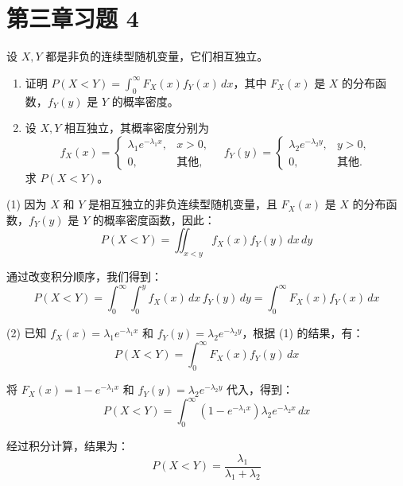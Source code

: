 \documentclass[twoside]{article}
\begin{document}
\maketitle
\vspace{-3.5em}

\tableofcontents

\section{第三章习题 4}

设 \( X, Y \) 都是非负的连续型随机变量，它们相互独立。
\begin{enumerate}
    \item 证明 \( P(X < Y) = \int_0^{\infty} F_X(x) f_Y(x) \, dx \)，其中 \( F_X(x) \) 是 \( X \) 的分布函数，\( f_Y(y) \) 是 \( Y \) 的概率密度。
    \item 设 \( X, Y \) 相互独立，其概率密度分别为
    \[
    f_X(x) = 
    \begin{cases} 
        \lambda_1 e^{-\lambda_1 x}, & x > 0, \\
        0, & \text{其他},
    \end{cases}
    \quad
    f_Y(y) = 
    \begin{cases} 
        \lambda_2 e^{-\lambda_2 y}, & y > 0, \\
        0, & \text{其他}.
    \end{cases}
    \]
    求 \( P(X < Y) \)。
\end{enumerate}

\begin{ans}{4}{4}
    (1) 因为 \( X \) 和 \( Y \) 是相互独立的非负连续型随机变量，且 \( F_X(x) \) 是 \( X \) 的分布函数，\( f_Y(y) \) 是 \( Y \) 的概率密度函数，因此：
    \[
    P(X < Y) = \iint_{x < y} f_X(x) f_Y(y) \, dx \, dy
    \]
    
    通过改变积分顺序，我们得到：
    \[
    P(X < Y) = \int_0^{\infty} \int_0^y f_X(x) \, dx \, f_Y(y) \, dy = \int_0^{\infty} F_X(x) f_Y(x) \, dx
    \]
    
    (2) 已知 \( f_X(x) = \lambda_1 e^{-\lambda_1 x} \) 和 \( f_Y(y) = \lambda_2 e^{-\lambda_2 y} \)，根据 (1) 的结果，有：
    \[
    P(X < Y) = \int_0^{\infty} F_X(x) f_Y(y) \, dx
    \]
    
    将 \( F_X(x) = 1 - e^{-\lambda_1 x} \) 和 \( f_Y(y) = \lambda_2 e^{-\lambda_2 y} \) 代入，得到：
    \[
    P(X < Y) = \int_0^{\infty} (1 - e^{-\lambda_1 x}) \lambda_2 e^{-\lambda_2 x} \, dx
    \]
    
    经过积分计算，结果为：
    \[
    P(X < Y) = \frac{\lambda_1}{\lambda_1 + \lambda_2}
    \]
\end{ans}
\end{document}
